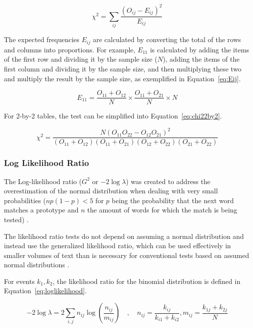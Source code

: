 \begin{equation}
  \label{eq:chi2}
  \chi^2 = \sum_{ij} \frac{(O_{ij} - E_{ij})^2}{E_{ij}}
\end{equation}

The expected frequencies $E_{ij}$ are calculated by converting the total of the
rows and columns into proportions. For example, $E_{11}$ is calculated by adding
the items of the first row and dividing it by the sample size ($N$), adding the
items of the first column and dividing it by the sample size, and then
multiplying these two and multiply the result by the sample size, as exemplified
in Equation~\ref{eq:Eij}.

\begin{equation}
  \label{eq:Eij}
  E_{11} = \frac{O_{11} + O_{12}}{N} \times \frac{O_{11} + O_{21}}{N} \times N
\end{equation}

For 2-by-2 tables, the test can be simplified into Equation~\ref{eq:chi22by2}.

\begin{equation}
  \label{eq:chi22by2}
  \chi^2 =  \frac{N(O_{11}O_{22} - O_{12}O_{21})^2}
            {(O_{11} + O_{12}) (O_{11} + O_{21})
             (O_{12} + O_{22}) (O_{21} + O_{22})}
\end{equation}


\subsubsection*{Log Likelihood Ratio}
\label{subsec:loglikeliood}

The Log-likelihood ratio ($G^2$ or $-2\log\lambda$) was created to address the
overestimation of the normal distribution when dealing with very small
probabilities ($np(1 - p) < 5$ for $p$ being the probability that the next word
matches a prototype and $n$ the amount of words for which the match is being
tested) \citep{dunning1993accurate}.

The likelihood ratio tests do not depend on assuming a normal distribution and
instead use the generalized likelihood ratio, which can be used effectively in
smaller volumes of text than is necessary for conventional tests based on
assumed normal distributions \citep{dunning1993accurate}.

For events $k_1,k_2$, the likelihood ratio for the binomial distribution is
defined in Equation~\ref{eq:loglikelihood}.

\begin{equation}
  \label{eq:loglikelihood}
  -2\log\lambda = 2 \sum_{i,j} n_{ij} \log \left( \frac{n_{ij}}{m_{ij}} \right)
  \quad ,\quad
  n_{ij} = \frac{k_{ij}}{k_{i1} + k_{i2}}, m_{ij} = \frac{k_{1j} + k_{2j}}{N}
\end{equation}

